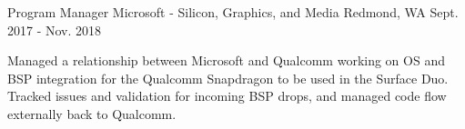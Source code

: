 \begin{cventries}
  \cventry
    {Program Manager} %
    {Microsoft - Silicon, Graphics, and Media} %
    {Redmond, WA} %
    {Sept. 2017 - Nov. 2018} %
    {
      \begin{cvitems} %
      	\item{Managed a relationship between Microsoft and Qualcomm working on OS and BSP integration for the Qualcomm Snapdragon to be used in the Surface Duo. Tracked issues and validation for incoming BSP drops, and managed code flow externally back to Qualcomm.}
      \end{cvitems}
    }

\end{cventries}
